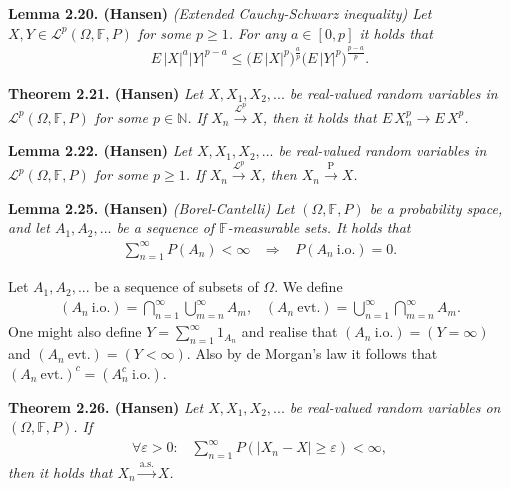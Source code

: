 \documentclass[a4paper,10pt,openany]{book}
\begin{document}
\textbf{Lemma 2.20. (Hansen)} \emph{(Extended Cauchy-Schwarz inequality) Let \(X,Y\in\mathcal{L}^p(\Omega,\mathbb{F},P)\) for some \(p\ge 1\). For any \(a\in[0,p]\) it holds that}
\begin{align*}
    E\, \vert X\vert^a\vert Y\vert^{p-a}\le \Big(E\, \vert X\vert^p\Big)^{\frac{a}{p}}\Big(E\, \vert Y\vert^p\Big)^{\frac{p-a}{p}}.\tag{2.29}
\end{align*}

\textbf{Theorem 2.21. (Hansen)} \emph{Let \(X,X_1,X_2,...\) be real-valued random variables in \(\mathcal{L}^p(\Omega,\mathbb{F},P)\) for some \(p\in\mathbb{N}\). If \(X_n\stackrel{\mathcal{L}^p}{\to} X\), then it holds that \(E\, X_n^p\to E\, X^p\).}

\textbf{Lemma 2.22. (Hansen)} \emph{Let \(X,X_1,X_2,...\) be real-valued random variables in \(\mathcal{L}^p(\Omega,\mathbb{F},P)\) for some \(p\ge 1\). If \(X_n\stackrel{\mathcal{L}^p}{\to} X\), then \(X_n\stackrel{\text{P}}{\to} X\).}

\textbf{Lemma 2.25. (Hansen)} \emph{(Borel-Cantelli) Let \((\Omega,\mathbb{F},P)\) be a probability space, and let \(A_1,A_2,...\) be a sequence of \(\mathbb{F}\)-measurable sets. It holds that}
\begin{align*}
    \sum_{n=1}^\infty P(A_n)<\infty\hspace{10pt}\Rightarrow\hspace{10pt}P(A_n\ \text{i.o.})=0.
\end{align*}

Let \(A_1,A_2,...\) be a sequence of subsets of \(\Omega\). We define
\begin{align*}
    (A_n\ \text{i.o.})=\bigcap_{n=1}^\infty\bigcup_{m=n}^\infty A_m,\hspace{10pt}(A_n\ \text{evt.})=\bigcup_{n=1}^\infty\bigcap_{m=n}^\infty A_m.
\end{align*}
One might also define \(Y=\sum_{n=1}^\infty 1_{A_n}\) and realise that \((A_n\ \text{i.o.})=(Y=\infty)\) and \((A_n\ \text{evt.})=(Y<\infty)\). Also by de Morgan's law it follows that \((A_n\ \text{evt.})^c=(A_n^c\ \text{i.o.})\).

\textbf{Theorem 2.26. (Hansen)} \emph{Let \(X,X_1,X_2,...\) be real-valued random variables on \((\Omega,\mathbb{F},P)\). If}
\begin{align*}
    \forall \varepsilon>0:\hspace{10pt}\sum_{n=1}^\infty P(\vert X_n-X\vert \ge \varepsilon)<\infty,\tag{2.32}
\end{align*}
\emph{then it holds that \(X_n\stackrel{\text{a.s.}}{\to} X\).}
\end{document}
